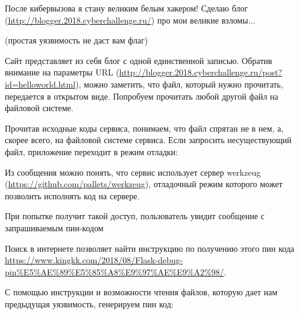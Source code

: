 
После кибервызова я стану великим белым хакером! Сделаю блог (\url{http://blogger.2018.cyberchallenge.ru/}) про мои великие взломы...

(простая уязвимость не даст вам флаг)

\solutionSection

Сайт представляет из себя блог с одной единственной записью. Обратив внимание на параметры URL (\url{http://blogger.2018.cyberchallenge.ru/post?id=helloworld.html}), можно заметить, что файл, который нужно прочитать, передается в открытом виде. Попробуем прочитать любой другой файл на файловой системе.


Прочитав исходные коды сервиса, понимаем, что файл спрятан не в нем, а, скорее всего, на файловой системе сервиса. Если запросить несуществующий файл, приложение переходит в режим отладки:


Из сообщения можно понять, что сервис использует сервер werkzeug (\url{https://github.com/pallets/werkzeug}), отладочный режим которого может позволить исполнять код на сервере.

При попытке получит такой доступ, пользователь увидит сообщение с запрашиваемым пин-кодом 


Поиск в интернете позволяет найти инструкцию по получению этого пин кода \url{https://www.kingkk.com/2018/08/Flask-debug-pin%E5%AE%89%E5%85%A8%E9%97%AE%E9%A2%98/}.

С помощью инструкции и возможности чтения файлов, которую дает нам предыдущая уязвимость, генерируем пин код:




